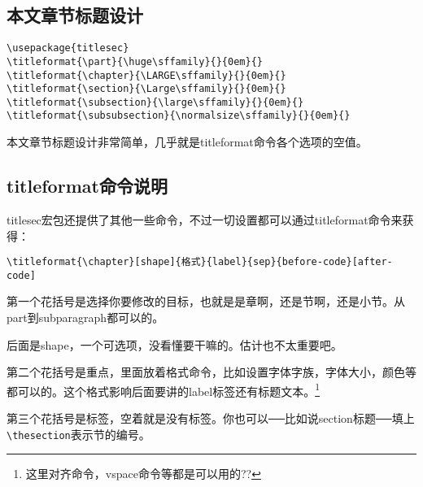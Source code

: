 \subsection{本文章节标题设计}
\begin{verbatim}
\usepackage{titlesec}
\titleformat{\part}{\huge\sffamily}{}{0em}{} 
\titleformat{\chapter}{\LARGE\sffamily}{}{0em}{} 
\titleformat{\section}{\Large\sffamily}{}{0em}{}
\titleformat{\subsection}{\large\sffamily}{}{0em}{}
\titleformat{\subsubsection}{\normalsize\sffamily}{}{0em}{}
\end{verbatim}
本文章节标题设计非常简单，几乎就是titleformat命令各个选项的空值。

\subsection{titleformat命令说明}
titlesec宏包还提供了其他一些命令，不过一切设置都可以通过titleformat命令来获得：
\begin{verbatim}
\titleformat{\chapter}[shape]{格式}{label}{sep}{before-code}[after-code]
\end{verbatim}
第一个花括号是选择你要修改的目标，也就是是章啊，还是节啊，还是小节。从part到subparagraph都可以的。

后面是shape，一个可选项，没看懂要干嘛的。估计也不太重要吧。

第二个花括号是重点，里面放着格式命令，比如设置字体字族，字体大小，颜色等都可以的。这个格式影响后面要讲的label标签还有标题文本。\footnote{这里对齐命令，vspace命令等都是可以用的??}

第三个花括号是标签，空着就是没有标签。你也可以──比如说section标题──填上\verb+\thesection+表示节的编号。

